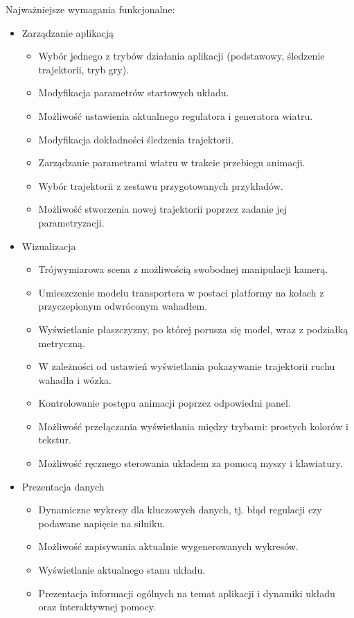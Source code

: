 \documentclass[12pt, oneside]{report}
\theoremstyle{definition}
\begin{document}
Najważniejsze wymagania funkcjonalne:
\begin{itemize}
\item Zarządzanie aplikacją
\begin{itemize}
\item Wybór jednego z trybów działania aplikacji (podstawowy, śledzenie trajektorii, tryb gry).
\item Modyfikacja parametrów startowych układu.
\item Możliwość ustawienia aktualnego regulatora i generatora wiatru.
\item Modyfikacja dokładności śledzenia trajektorii.
\item Zarządzanie parametrami wiatru w trakcie przebiegu animacji.
\item Wybór trajektorii z zestawu przygotowanych przykładów.
\item Możliwość stworzenia nowej trajektorii poprzez zadanie jej parametryzacji.
\end{itemize}
\item Wizualizacja
\begin{itemize}
\item Trójwymiarowa scena z możliwością swobodnej manipulacji kamerą.
\item Umieszczenie modelu transportera w postaci platformy na kołach z przyczepionym odwróconym wahadłem.
\item Wyświetlanie płaszczyzny, po której porusza się model, wraz z podziałką metryczną. 
\item W zależności od ustawień wyświetlania pokazywanie trajektorii ruchu wahadła i wózka.
\item Kontrolowanie postępu animacji poprzez odpowiedni panel.
\item Możliwość przełączania wyświetlania między trybami: prostych kolorów i tekstur.
\item Możliwość ręcznego sterowania układem za pomocą myszy i klawiatury.
\end{itemize}
\item Prezentacja danych
\begin{itemize}
\item Dynamiczne wykresy dla kluczowych danych, tj. błąd regulacji czy podawane napięcie na silniku.
\item Możliwość zapisywania aktualnie wygenerowanych wykresów.
\item Wyświetlanie aktualnego stanu układu.
\item Prezentacja informacji ogólnych na temat aplikacji i dynamiki układu oraz interaktywnej pomocy.
\end{itemize}
\end{itemize}
\end{document}
